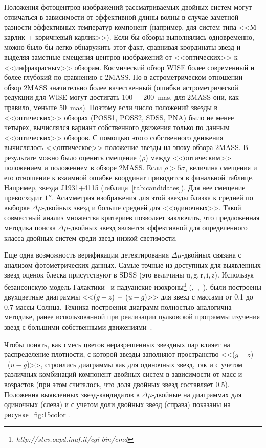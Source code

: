 Положения фотоцентров изображений рассматриваемых двойных систем могут отличаться в зависимости от эффективной длины волны в случае заметной разности эффективных температур компонент (например, для систем типа <<М-карлик + коричневый карлик>>). Если бы обзоры выполнялись одновременно, можно было бы легко обнаружить этот факт, сравнивая координаты звезд и выделяя заметные смещения центров изображений от <<оптических>> к <<инфракрасным>> обзорам. Космический обзор WISE более современный и более глубокий по сравнению с 2MASS. Но в астрометрическом отношении обзор 2MASS значительно более качественный (ошибки астрометрической редукции для WISE могут достигать 100~--~200~mas, для 2MASS они, как правило, меньше 50~mas). Поэтому если число положений звезды в <<оптических>> обзорах (POSS1, POSS2, SDSS, PNA) было не менее четырех, вычислялся вариант собственного движения только по данным <<оптических>> обзоров. С помощью этого собственного движения вычислялось <<оптическое>> положение звезды на эпоху обзора 2MASS. В результате можно было оценить смещение ($\rho$) между <<оптическим>> положением и положением в обзоре 2MASS. Если $\rho>5\sigma$, величина смещения и его отношение к взаимной ошибке координат приводится в финальной таблице. Например, звезда J1931+4115 (таблица~\ref{tab:candidates}). Для нее смещение превосходит $1''$. Асимметрия изображения для этой звезды близка к средней по выборке $\Delta\mu$-двойных звезд и больше средней для <<одиночных>>. Такой совместный анализ множества критериев позволяет заключить, что предложенная методика поиска $\Delta\mu$-двойных звезд является эффективной для определенного класса двойных систем среди звезд низкой светимости.

Еще одна возможность верификации детектирования $\Delta\mu$-двойных связана с анализом фотометрических данных. Самые точные из доступных для выявленных звезд оценок блеска присутствуют в SDSS (это величины u,\,g,\,r,\,i,\,z). Используя безансонскую модель Галактики~\cite{2003A&A...409..523R} и падуанские изохроны\footnote{\textit{http://stev.oapd.inaf.it/cgi-bin/cmd}} (\cite{2012MNRAS.427..127B},~\cite{2014MNRAS.444.2525C},~\cite{2014MNRAS.445.4287T}), были построены двухцветные диаграммы <<($g-z$)~--~($u-g$)>> для звезд с массами от 0.1 до 0.7 массы Солнца. Техника построения диаграмм полностью аналогична методике, ранее использованной при реализации пулковской программы изучения звезд с большими собственными движениями~\cite{2013MNRAS.435.1083K}.

Чтобы понять, как смесь цветов неразрешенных звездных пар влияет на распределение плотности, с которой звезды заполняют пространство <<($g-z$)~--~($u-g$)>>, строились диаграммы как для одиночных звезд, так и с учетом различных комбинаций компонент двойных систем в зависимости от масс и возрастов (при этом считалось, что доля двойных звезд составляет 0.5).  Положения выявленных звезд-кандидатов в $\Delta\mu$-двойные на диаграммах для одиночных (слева) и с учетом доли двойных звезд (справа) показаны на рисунке~\ref{fig:15color}.

